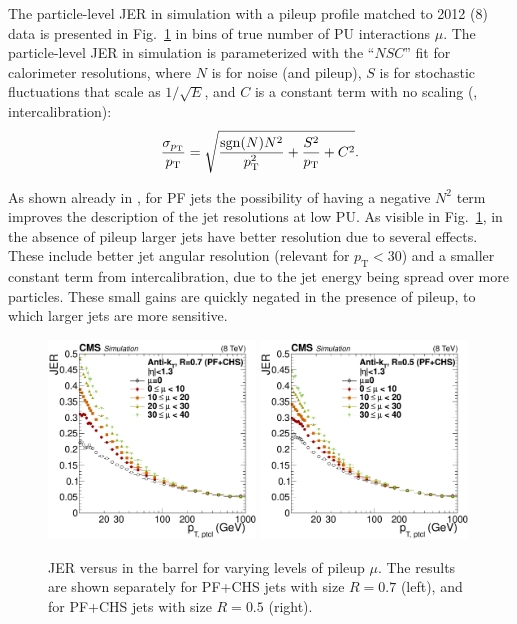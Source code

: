 \documentclass[11pt,twoside,a4paper,cmspaper,final,collab]{cms-tdr}
\begin{document}
The particle-level JER in simulation with a pileup profile matched to 2012 (8\TeV) data is presented in Fig.~\ref{fig:mcjer} in bins of true number of PU interactions $\mu$.
The particle-level JER in simulation is parameterized with the ``$NSC$'' fit for calorimeter resolutions, where $N$ is for noise (and pileup), $S$ is for stochastic fluctuations that scale as $1/\sqrt{E}$, and $C$ is a constant term with no \pt scaling (\eg, intercalibration):
\begin{equation}
\frac{\sigma_{p_{\mathrm{T}}}}{p_{\mathrm{T}}} = \sqrt{\frac{\operatorname{sgn}(N)N^2}{p_{\mathrm{T}}^2} + \frac{S^2}{p_{\mathrm{T}}} + C^2}.
\end{equation}

As shown already in \cite{JEC_JINST}, for PF jets the possibility of having a negative $N^2$ term improves the description of the jet resolutions at low PU.
As visible in Fig.~\ref{fig:mcjer}, in the absence of pileup larger jets have better resolution due to several effects. These include better jet angular resolution (relevant for $p_\mathrm{T}<30$\GeV) and a smaller constant term from intercalibration, due to the jet energy being spread over more particles. These small gains are quickly negated in the presence of pileup, to which larger jets are more sensitive.

\begin{figure}[htbp!]
\centering
\includegraphics[width=0.49\textwidth]{Figure_036-a.pdf}
\includegraphics[width=0.49\textwidth]{Figure_036-b.pdf}
\caption{\label{fig:mcjer}
JER versus \pt in the barrel for varying levels of pileup $\mu$.
The results are shown separately for PF+CHS jets with size $R=0.7$ (left), and for PF+CHS jets with size $R=0.5$ (right).
}
\end{figure}
\end{document}
